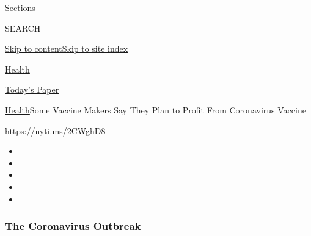 Sections

SEARCH

\protect\hyperlink{site-content}{Skip to
content}\protect\hyperlink{site-index}{Skip to site index}

\href{https://www.nytimes3xbfgragh.onion/section/health}{Health}

\href{https://myaccount.nytimes3xbfgragh.onion/auth/login?response_type=cookie\&client_id=vi}{}

\href{https://www.nytimes3xbfgragh.onion/section/todayspaper}{Today's
Paper}

\href{/section/health}{Health}\textbar{}Some Vaccine Makers Say They
Plan to Profit From Coronavirus Vaccine

\url{https://nyti.ms/2CWghD8}

\begin{itemize}
\item
\item
\item
\item
\item
\end{itemize}

\hypertarget{the-coronavirus-outbreak}{%
\subsubsection{\texorpdfstring{\href{https://www.nytimes3xbfgragh.onion/news-event/coronavirus?name=styln-coronavirus-national\&region=TOP_BANNER\&block=storyline_menu_recirc\&action=click\&pgtype=Article\&impression_id=dadfd880-efba-11ea-b84b-3bf7ccc2e294\&variant=undefined}{The
Coronavirus
Outbreak}}{The Coronavirus Outbreak}}\label{the-coronavirus-outbreak}}

